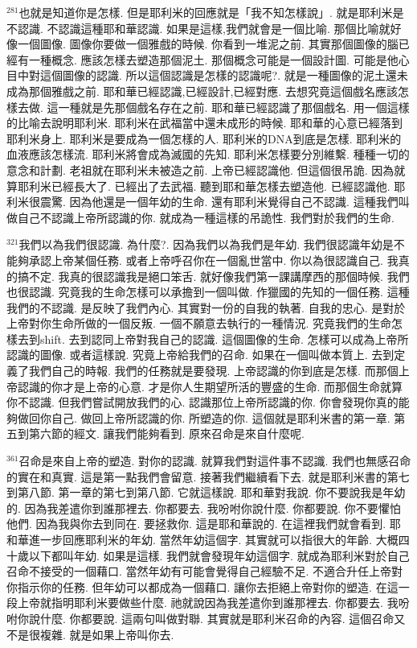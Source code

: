 \documentclass{book}
\begin{document}
$^{281}$也就是知道你是怎樣.
但是耶利米的回應就是「我不知怎樣說」.
就是耶利米是不認識.
不認識這種耶和華認識.
如果是這樣,我們就會是一個比喻.
那個比喻就好像一個圖像.
圖像你要做一個雅戲的時候.
你看到一堆泥之前.
其實那個圖像的腦已經有一種概念.
應該怎樣去塑造那個泥土.
那個概念可能是一個設計圖.
可能是他心目中對這個圖像的認識.
所以這個認識是怎樣的認識呢?.
就是一種圖像的泥土還未成為那個雅戲之前.
耶和華已經認識,已經設計,已經對應.
去想究竟這個戲名應該怎樣去做.
這一種就是先那個戲名存在之前.
耶和華已經認識了那個戲名.
用一個這樣的比喻去說明耶利米.
耶利米在武福當中還未成形的時候.
耶和華的心意已經落到耶利米身上.
耶利米是要成為一個怎樣的人.
耶利米的DNA到底是怎樣.
耶利米的血液應該怎樣流.
耶利米將會成為滅國的先知.
耶利米怎樣要分別維繫.
種種一切的意念和計劃.
老祖就在耶利米未被造之前.
上帝已經認識他.
但這個很吊詭.
因為就算耶利米已經長大了.
已經出了去武福.
聽到耶和華怎樣去塑造他.
已經認識他.
耶利米很震驚.
因為他還是一個年幼的生命.
還有耶利米覺得自己不認識.
這種我們叫做自己不認識上帝所認識的你.
就成為一種這樣的吊詭性.
我們對於我們的生命.

$^{321}$我們以為我們很認識.
為什麼?.
因為我們以為我們是年幼.
我們很認識年幼是不能夠承認上帝某個任務.
或者上帝呼召你在一個亂世當中.
你以為很認識自己.
我真的搞不定.
我真的很認識我是絕口笨舌.
就好像我們第一課講摩西的那個時候.
我們也很認識.
究竟我的生命怎樣可以承擔到一個叫做.
作獵國的先知的一個任務.
這種我們的不認識.
是反映了我們內心.
其實對一份的自我的執著.
自我的忠心.
是對於上帝對你生命所做的一個反叛.
一個不願意去執行的一種情況.
究竟我們的生命怎樣去到shift.
去到認同上帝對我自己的認識.
這個圖像的生命.
怎樣可以成為上帝所認識的圖像.
或者這樣說.
究竟上帝給我們的召命.
如果在一個叫做本質上.
去到定義了我們自己的時報.
我們的任務就是要發現.
上帝認識的你到底是怎樣.
而那個上帝認識的你才是上帝的心意.
才是你人生期望所活的豐盛的生命.
而那個生命就算你不認識.
但我們嘗試開放我們的心.
認識那位上帝所認識的你.
你會發現你真的能夠做回你自己.
做回上帝所認識的你.
所塑造的你.
這個就是耶利米書的第一章.
第五到第六節的經文.
讓我們能夠看到.
原來召命是來自什麼呢.

$^{361}$召命是來自上帝的塑造.
對你的認識.
就算我們對這件事不認識.
我們也無感召命的實在和真實.
這是第一點我們會留意.
接著我們繼續看下去.
就是耶利米書的第七到第八節.
第一章的第七到第八節.
它就這樣說.
耶和華對我說.
你不要說我是年幼的.
因為我差遣你到誰那裡去.
你都要去.
我吩咐你說什麼.
你都要說.
你不要懼怕他們.
因為我與你去到同在.
要拯救你.
這是耶和華說的.
在這裡我們就會看到.
耶和華進一步回應耶利米的年幼.
當然年幼這個字.
其實就可以指很大的年齡.
大概四十歲以下都叫年幼.
如果是這樣.
我們就會發現年幼這個字.
就成為耶利米對於自己召命不接受的一個藉口.
當然年幼有可能會覺得自己經驗不足.
不適合升任上帝對你指示你的任務.
但年幼可以都成為一個藉口.
讓你去拒絕上帝對你的塑造.
在這一段上帝就指明耶利米要做些什麼.
祂就說因為我差遣你到誰那裡去.
你都要去.
我吩咐你說什麼.
你都要說.
這兩句叫做對聯.
其實就是耶利米召命的內容.
這個召命又不是很複雜.
就是如果上帝叫你去.
\end{document}
